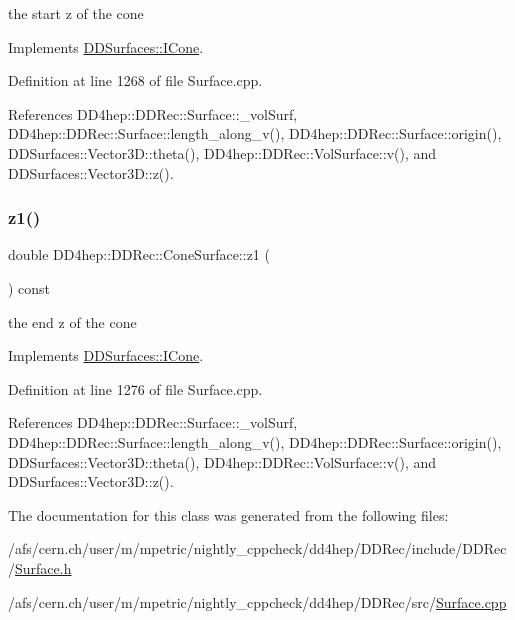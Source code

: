 the start z of the cone 



Implements \hyperlink{class_d_d_surfaces_1_1_i_cone_a306dd8443c146ce57ebf98f7f5c11013}{D\+D\+Surfaces\+::\+I\+Cone}.



Definition at line 1268 of file Surface.\+cpp.



References D\+D4hep\+::\+D\+D\+Rec\+::\+Surface\+::\+\_\+vol\+Surf, D\+D4hep\+::\+D\+D\+Rec\+::\+Surface\+::length\+\_\+along\+\_\+v(), D\+D4hep\+::\+D\+D\+Rec\+::\+Surface\+::origin(), D\+D\+Surfaces\+::\+Vector3\+D\+::theta(), D\+D4hep\+::\+D\+D\+Rec\+::\+Vol\+Surface\+::v(), and D\+D\+Surfaces\+::\+Vector3\+D\+::z().

\hypertarget{class_d_d4hep_1_1_d_d_rec_1_1_cone_surface_a2928c2663e6d181315172b0e3339abe0}{}\label{class_d_d4hep_1_1_d_d_rec_1_1_cone_surface_a2928c2663e6d181315172b0e3339abe0} 
\subsubsection{\texorpdfstring{z1()}{z1()}}
{\footnotesize\ttfamily double D\+D4hep\+::\+D\+D\+Rec\+::\+Cone\+Surface\+::z1 (\begin{DoxyParamCaption}{ }\end{DoxyParamCaption}) const\hspace{0.3cm}{\ttfamily [virtual]}}



the end z of the cone 



Implements \hyperlink{class_d_d_surfaces_1_1_i_cone_a7bb86876e5f5196ea11ac78bcaa42dbc}{D\+D\+Surfaces\+::\+I\+Cone}.



Definition at line 1276 of file Surface.\+cpp.



References D\+D4hep\+::\+D\+D\+Rec\+::\+Surface\+::\+\_\+vol\+Surf, D\+D4hep\+::\+D\+D\+Rec\+::\+Surface\+::length\+\_\+along\+\_\+v(), D\+D4hep\+::\+D\+D\+Rec\+::\+Surface\+::origin(), D\+D\+Surfaces\+::\+Vector3\+D\+::theta(), D\+D4hep\+::\+D\+D\+Rec\+::\+Vol\+Surface\+::v(), and D\+D\+Surfaces\+::\+Vector3\+D\+::z().



The documentation for this class was generated from the following files\+:\begin{DoxyCompactItemize}
\item 
/afs/cern.\+ch/user/m/mpetric/nightly\+\_\+cppcheck/dd4hep/\+D\+D\+Rec/include/\+D\+D\+Rec/\hyperlink{_surface_8h}{Surface.\+h}\item 
/afs/cern.\+ch/user/m/mpetric/nightly\+\_\+cppcheck/dd4hep/\+D\+D\+Rec/src/\hyperlink{_surface_8cpp}{Surface.\+cpp}\end{DoxyCompactItemize}
